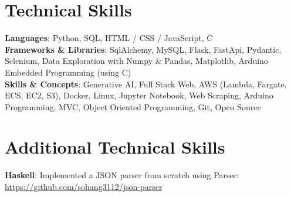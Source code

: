 \documentclass[letterpaper,11pt]{article}
\begin{document}
\section{Technical Skills}
 \begin{itemize}[leftmargin=0.15in, label={}]
    \small{\item{
     \textbf{Languages}{: Python, SQL, HTML / CSS / JavaScript, C} \\
     \textbf{Frameworks \& Libraries}{: SqlAlchemy, MySQL, Flask, FastApi, Pydantic, Selenium, Data Exploration with Numpy \& Pandas, Matplotlib, Arduino Embedded Programming (using C)} \\
     \textbf{Skills \& Concepts}{: Generative AI, Full Stack Web, AWS (Lambda, Fargate, ECS, EC2, S3), Docker, Linux, Jupyter Notebook, Web Scraping, Arduino Programming, MVC, Object Oriented Programming, Git, Open Source} \\
    }}
 \end{itemize}

\section{Additional Technical Skills}
 \begin{itemize}[leftmargin=0.15in, label={}]
    \small{\item{
     \textbf{Haskell}: Implemented a JSON \textsf{parser} from scratch using \textsf{Parsec}: \url{https://github.com/sohang3112/json-parser} \\

    }}
 \end{itemize}

\end{document}
